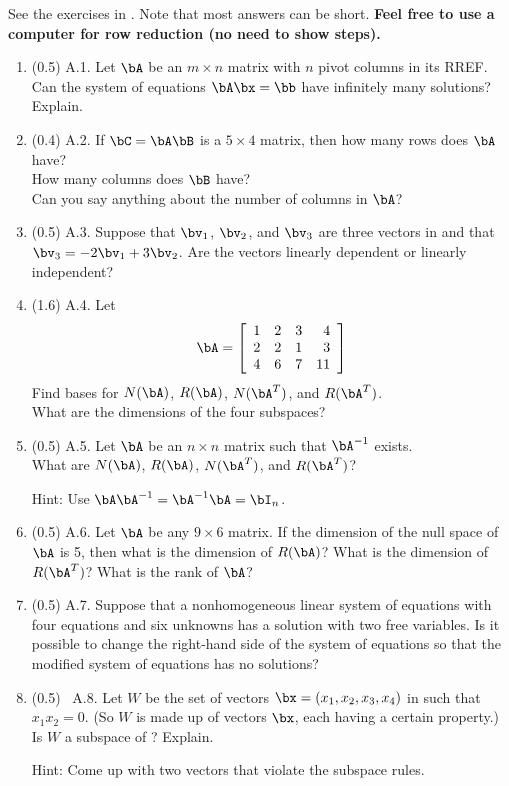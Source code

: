 \documentclass[11pt,titlepage,fleqn]{article}
\begin{document}
See the exercises in \citet[][Section A.12]{Aster}. Note that most answers can be short. {\bf Feel free to use a computer for row reduction (no need to show steps).}

\begin{enumerate}
\item (0.5) A.1. Let $\bA$ be an $m \times n$ matrix with $n$ pivot columns in its RREF. \\
Can the system of equations $\bA\bx=\bb$ have infinitely many solutions? Explain.

\item (0.4) A.2. If $\bC = \bA\bB$ is a $5 \times 4$ matrix, then how many rows does $\bA$ have? \\
How many columns does $\bB$ have? \\
Can you say anything about the number of columns in $\bA$?

\item (0.5) A.3. Suppose that $\bv_1$, $\bv_2$, and $\bv_3$ are three vectors in  and that $\bv_3 = -2\bv_1 + 3\bv_2$. Are the vectors linearly dependent or linearly independent?

\item (1.6) A.4. Let
%
\begin{equation*}
\bA =  \left[ \begin{array}{rrrr}
     1  &   2  &   3 & 4 \\
     2  &   2  &   1 & 3 \\
     4  &   6  &   7 & 11 \\
\end{array} \right]
\end{equation*}
%
Find bases for $N(\bA)$, $R(\bA)$, $N(\bA^T)$, and $R(\bA^T)$. \\
What are the dimensions of the four subspaces?

\item (0.5) A.5. Let $\bA$ be an $n \times n$ matrix such that $\bA^{-1}$ exists. \\
What are $N(\bA)$, $R(\bA)$, $N(\bA^T)$, and $R(\bA^T)$?

Hint: Use $\bA\bA^{-1} = \bA^{-1}\bA = \bI_n$.

\item (0.5) A.6. Let $\bA$ be any $9 \times 6$ matrix. If the dimension of the null space of $\bA$ is 5, then what is the dimension of $R(\bA)$? What is the dimension of $R(\bA^T)$? What is the rank of $\bA$?

\item (0.5) A.7. Suppose that a nonhomogeneous linear system of equations with four equations and six unknowns has a solution with two free variables. Is it possible to change the right-hand side of the system of equations so that the modified system of equations has no solutions?

\item (0.5) \ptag\ A.8. Let $W$ be the set of vectors $\bx = (x_1,x_2,x_3,x_4)$ in  such that $x_1 x_2 = 0$. (So $W$ is made up of vectors $\bx$, each having a certain property.) Is $W$ a subspace of ? Explain.

Hint: Come up with two vectors that violate the subspace rules.
\end{enumerate}
\end{document}
